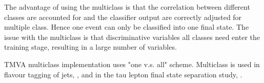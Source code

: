 The advantage of using the multiclass is that the correlation between different classes are accounted for and the classifier output are correctly adjusted for multiple class. Hence one event can only be classified into one final state. The issue with the multiclass is that discriminative variables all classes need enter the training stage, resulting in a large number of variables.

TMVA multiclass implementation uses "one v.s. all" scheme. Multiclass is used in flavour tagging of jets, , and in the tau lepton final state separation study, \Section{}.

